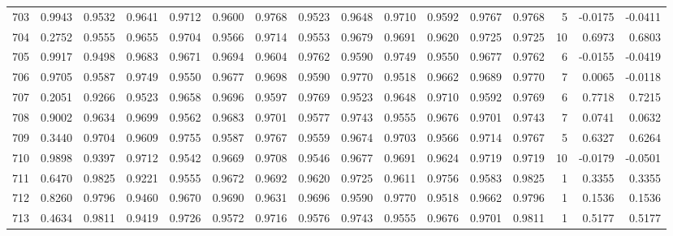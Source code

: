 \begin{tabular}{lrrrrrrrrrrrrrrr}
703 &      0.9943 &  0.9532 &  0.9641 &  0.9712 &  0.9600 &  0.9768 &  0.9523 &  0.9648 &  0.9710 &  0.9592 &   0.9767 &     0.9768 &      5 &                   -0.0175 &                    -0.0411 \\
704 &      0.2752 &  0.9555 &  0.9655 &  0.9704 &  0.9566 &  0.9714 &  0.9553 &  0.9679 &  0.9691 &  0.9620 &   0.9725 &     0.9725 &     10 &                    0.6973 &                     0.6803 \\
705 &      0.9917 &  0.9498 &  0.9683 &  0.9671 &  0.9694 &  0.9604 &  0.9762 &  0.9590 &  0.9749 &  0.9550 &   0.9677 &     0.9762 &      6 &                   -0.0155 &                    -0.0419 \\
706 &      0.9705 &  0.9587 &  0.9749 &  0.9550 &  0.9677 &  0.9698 &  0.9590 &  0.9770 &  0.9518 &  0.9662 &   0.9689 &     0.9770 &      7 &                    0.0065 &                    -0.0118 \\
707 &      0.2051 &  0.9266 &  0.9523 &  0.9658 &  0.9696 &  0.9597 &  0.9769 &  0.9523 &  0.9648 &  0.9710 &   0.9592 &     0.9769 &      6 &                    0.7718 &                     0.7215 \\
708 &      0.9002 &  0.9634 &  0.9699 &  0.9562 &  0.9683 &  0.9701 &  0.9577 &  0.9743 &  0.9555 &  0.9676 &   0.9701 &     0.9743 &      7 &                    0.0741 &                     0.0632 \\
709 &      0.3440 &  0.9704 &  0.9609 &  0.9755 &  0.9587 &  0.9767 &  0.9559 &  0.9674 &  0.9703 &  0.9566 &   0.9714 &     0.9767 &      5 &                    0.6327 &                     0.6264 \\
710 &      0.9898 &  0.9397 &  0.9712 &  0.9542 &  0.9669 &  0.9708 &  0.9546 &  0.9677 &  0.9691 &  0.9624 &   0.9719 &     0.9719 &     10 &                   -0.0179 &                    -0.0501 \\
711 &      0.6470 &  0.9825 &  0.9221 &  0.9555 &  0.9672 &  0.9692 &  0.9620 &  0.9725 &  0.9611 &  0.9756 &   0.9583 &     0.9825 &      1 &                    0.3355 &                     0.3355 \\
712 &      0.8260 &  0.9796 &  0.9460 &  0.9670 &  0.9690 &  0.9631 &  0.9696 &  0.9590 &  0.9770 &  0.9518 &   0.9662 &     0.9796 &      1 &                    0.1536 &                     0.1536 \\
713 &      0.4634 &  0.9811 &  0.9419 &  0.9726 &  0.9572 &  0.9716 &  0.9576 &  0.9743 &  0.9555 &  0.9676 &   0.9701 &     0.9811 &      1 &                    0.5177 &                     0.5177 \\

\end{tabular}
